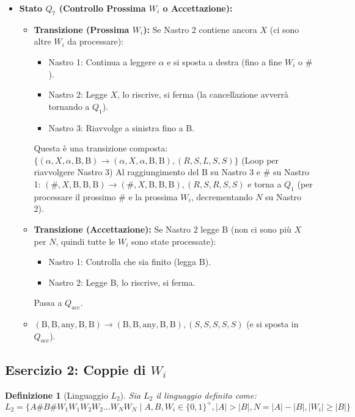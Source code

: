 \documentclass[a4paper, 11pt]{book} %
\newtheorem{definition}[theorem]{Definizione}
\theoremstyle{definition}
\newcommand{\B}{\text{B}} %
\begin{document}
\begin{itemize}
\begin{itemize}
        \end{itemize}
    \item \textbf{Stato $Q_7$ (Controllo Prossima $W_i$ o Accettazione):}
        \begin{itemize}
            \item \textbf{Transizione (Prossima $W_i$):}
                Se Nastro 2 contiene ancora $X$ (ci sono altre $W_i$ da processare):
                \begin{itemize}
                    \item Nastro 1: Continua a leggere $\alpha$ e si sposta a destra (fino a fine $W_i$ o $\#$).
                    \item Nastro 2: Legge $X$, lo riscrive, si ferma (la cancellazione avverrà tornando a $Q_1$).
                    \item Nastro 3: Riavvolge a sinistra fino a $\B$.
                \end{itemize}
                Questa è una transizione composta:
                $\{ (\alpha, X, \alpha, \B, \B) \to (\alpha, X, \alpha, \B, \B), (R,S,L,S,S) \}$ (Loop per riavvolgere Nastro 3)
                Al raggiungimento del $\B$ su Nastro 3 e $\#$ su Nastro 1:
                $(\#, X, \B, \B, \B) \to (\#, X, \B, \B, \B), (R,S,R,S,S)$ e torna a $Q_1$ (per processare il prossimo $\#$ e la prossima $W_i$, decrementando $N$ su Nastro 2).
            \item \textbf{Transizione (Accettazione):}
                Se Nastro 2 legge $\B$ (non ci sono più $X$ per $N$, quindi tutte le $W_i$ sono state processate):
                \begin{itemize}
                    \item Nastro 1: Controlla che sia finito (legga $\B$).
                    \item Nastro 2: Legge $\B$, lo riscrive, si ferma.
                \end{itemize}
                Passa a $Q_{acc}$.
                \item $(\B, \B, \text{any}, \B, \B) \to (\B, \B, \text{any}, \B, \B), (S,S,S,S,S)$ (e si sposta in $Q_{acc}$).
        \end{itemize}
\end{itemize}

\subsection{Esercizio 2: Coppie di $W_i$}

\begin{definition}[Linguaggio $L_2$]
Sia $L_2$ il linguaggio definito come:
$L_2 = \{ A\#B\#W_1 W_1 W_2 W_2 \dots W_N W_N \mid A, B, W_i \in \{0,1\}^+, |A| > |B|, N = |A| - |B|, |W_i| \ge |B| \}$
\end{definition}
\end{document}
